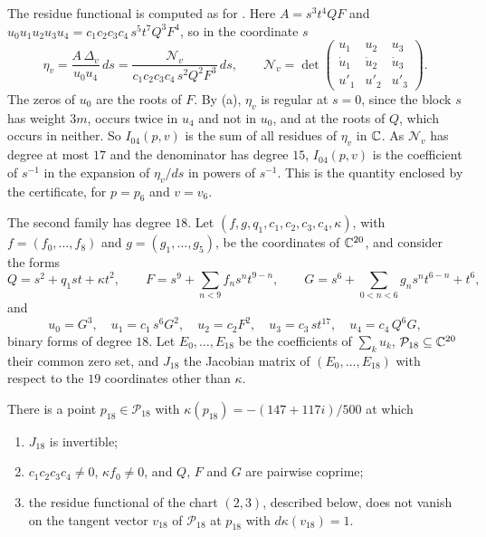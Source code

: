 The residue functional is computed as for . Here
$A=s^{3}t^{4}QF$ and $u_{0}u_{1}u_{2}u_{3}u_{4}=c_{1}c_{2}c_{3}c_{4}\,
s^{5}t^{7}Q^{3}F^{4}$, so in the coordinate $s$
\[
  \eta_{v}=\frac{A\,\Delta_{v}}{u_{0}u_{4}}\,ds=\frac{\mathcal N_{v}}
  {c_{1}c_{2}c_{3}c_{4}\,s^{2}Q^{2}F^{3}}\,ds,\qquad\mathcal N_{v}=
  \det\begin{pmatrix}u_{1}&u_{2}&u_{3}\\ \dot u_{1}&\dot u_{2}&\dot u_{3}\\
  u'_{1}&u'_{2}&u'_{3}\end{pmatrix}.
\]
The zeros of $u_{0}$ are the roots of $F$. By (a),
$\eta_{v}$ is regular at $s=0$, since the block $s$ has weight $3m$, occurs
twice in $u_{4}$ and not in $u_{0}$, and at the roots of $Q$, which occurs in
neither. So $I_{04}(p,v)$ is the sum of all residues of $\eta_{v}$ in $\mathbb{C}$.
As $\mathcal N_{v}$ has degree at most $17$ and the denominator has degree
$15$, $I_{04}(p,v)$ is the coefficient of $s^{-1}$ in the expansion of
$\eta_{v}/ds$ in powers of $s^{-1}$. This is the quantity enclosed by the
certificate, for $p=p_{6}$ and $v=v_{6}$.

The second family has degree $18$. Let $(f,g,q_{1},c_{1},c_{2},c_{3},c_{4},
\kappa)$, with $f=(f_{0},\dots,f_{8})$ and $g=(g_{1},\dots,g_{5})$, be the
coordinates of $\mathbb{C}^{20}$, and consider the forms
\[
  Q=s^{2}+q_{1}st+\kappa t^{2},\qquad F=s^{9}+\sum_{n<9}f_{n}s^{n}t^{9-n},
  \qquad G=s^{6}+\sum_{0<n<6}g_{n}s^{n}t^{6-n}+t^{6},
\]
and
\[
  u_{0}=G^{3},\quad u_{1}=c_{1}\,s^{6}G^{2},\quad u_{2}=c_{2}F^{2},\quad
  u_{3}=c_{3}\,st^{17},\quad u_{4}=c_{4}\,Q^{6}G,
\]
binary forms of degree $18$. Let $E_{0},\dots,E_{18}$ be the coefficients
of $\sum_{k}u_{k}$, $\mathcal P_{18}\subseteq\mathbb{C}^{20}$ their common zero set,
and $J_{18}$ the Jacobian matrix of $(E_{0},\dots,E_{18})$ with respect to
the $19$ coordinates other than $\kappa$.

\begin{proposition}\label{prop:family51b}
There is a point $p_{18}\in\mathcal P_{18}$ with
$\kappa(p_{18})=-(147+117i)/500$ at which
\begin{enumerate}[label=\textup{(\roman*)}]
\item $J_{18}$ is invertible;
\item $c_{1}c_{2}c_{3}c_{4}\ne0$, $\kappa f_{0}\ne0$, and $Q$, $F$ and $G$ are
pairwise coprime;
\item the residue functional of the chart $(2,3)$, described below, does
not vanish on the tangent vector $v_{18}$ of $\mathcal P_{18}$ at $p_{18}$
with $d\kappa(v_{18})=1$.
\end{enumerate}
\end{proposition}

